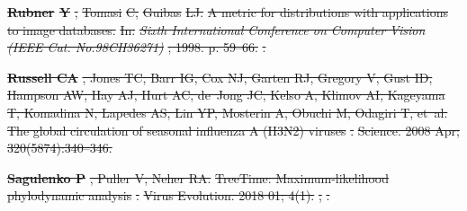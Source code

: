 \documentclass[9pt,lineno]{elife} %
\providecommand{\DIFdel}[1]{{\protect\color{red}\sout{#1}}}                      %
\providecommand{\DIFdeltex}[1]{{\protect\color{red}\sout{#1}}}                      %
\providecommand{\DIFdel}[1]{\texorpdfstring{\DIFdeltex{#1}}{}} %
\begin{document}
\textbf{%
\DIFdel{Rubner}%
\DIFdel{Y}}%
\DIFdel{, }%
\DIFdel{Tomasi}%
\DIFdel{C, }%
\DIFdel{Guibas}%
\DIFdel{LJ.
}%
\DIFdel{A metric for distributions with applications to image databases.
}%
\DIFdel{In: }\emph{\DIFdel{Sixth International Conference on Computer Vision (IEEE
  Cat. No.98CH36271)}}%
\DIFdel{; 1998. p. 59--66.
}%
\DIFdel{.
}%

\textbf{%
\DIFdel{Russell CA}}%
\DIFdel{, Jones TC, Barr IG, Cox NJ, Garten
  RJ, Gregory V, Gust ID, Hampson AW, Hay AJ, Hurt AC, de~Jong JC, Kelso A,
  Klimov AI, Kageyama T, Komadina N, Lapedes AS, Lin YP, Mosterin A, Obuchi M,
  Odagiri T, et~al.
}%
\DIFdel{The global circulation of seasonal influenza A (H3N2) viruses}%
\DIFdel{.
}%
\DIFdel{Science.  2008 Apr; 320(5874):340--346.
}%

\textbf{%
\DIFdel{Sagulenko P}}%
\DIFdel{, Puller V, Neher RA.
}%
\DIFdel{TreeTime: Maximum-likelihood phylodynamic analysis}%
\DIFdel{.
}%
\DIFdel{Virus Evolution.  2018 01; 4(1).
}%
\DIFdel{,
  }%
\DIFdel{.
}%
\end{document}
